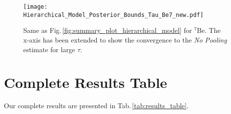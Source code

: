 \documentclass{aa}
\newcommand{\mrm}[1]{\mathrm{#1}}
\newcommand{\nuc}[2]{$\mrm{^{#2}#1}$}
\begin{document}
\begin{figure}[!hbtp]
	\centering
	\texttt{[image: Hierarchical\_Model\_Posterior\_Bounds\_Tau\_Be7\_new.pdf]}
	\caption{Same as Fig.\,\ref{fig:summary_plot_hierarchical_model} for \nuc{Be}{7}. The x-axis has been extended to show the convergence to the \textit{No Pooling} estimate for large $\tau$.}
	\label{fig:summary_plot_hierarchical_model_be7}
\end{figure}

\onecolumn

\section{Complete Results Table}\label{sec:results_table}
%
Our complete results are presented in Tab.\,\ref{tab:results_table}.
\end{document}
